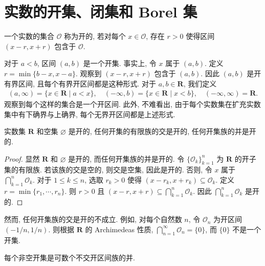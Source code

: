 \documentclass[../../main.tex]{subfiles}
\begin{document}
\section{实数的开集、闭集和 Borel 集}\label{section:ch01-开集闭集Borel}

\begin{definition}[开集]\label{definition:ch01-开集}
一个实数的集合 $\mathcal{O}$ 称为开的, 若对每个 $x\in\mathcal{O}$, 存在 $r>0$ 使得区间 $(x-r,x+r)$ 包含于 $\mathcal{O}$.
\end{definition}

对于 $a<b$, 区间 $(a,b)$ 是一个开集. 事实上, 令 $x$ 属于 $(a,b)$. 定义 $r=\min\{b-x,x-a\}$. 观察到 $(x-r,x+r)$ 包含于 $(a,b)$. 因此 $(a,b)$ 是开有界区间, 且每个有界开区间都是这种形式. 对于 $a,b\in\mathbf{R}$, 我们定义
\begin{align*}
(a,\infty)=\{x\in\mathbf{R}\mid a<x\},\quad (-\infty,b)=\{x\in\mathbf{R}\mid x<b\},\quad (-\infty,\infty)=\mathbf{R}.
\end{align*}
观察到每个这样的集合是一个开区间. 此外, 不难看出, 由于每个实数集在扩充实数集中有下确界与上确界, 每个无界开区间都是上述形式.

\begin{proposition}\label{proposition:ch01-开集性质}
实数集 $\mathbf{R}$ 和空集 $\varnothing$ 是开的, 任何开集的有限族的交是开的, 任何开集族的并是开的.
\end{proposition}

\begin{proof}
显然 $\mathbf{R}$ 和 $\varnothing$ 是开的, 而任何开集族的并是开的. 令 $\{\mathcal{O}_{k}\}_{k=1}^{n}$ 为 $\mathbf{R}$ 的开子集的有限族. 若该族的交是空的, 则交是空集, 因此是开的. 否则, 令 $x$ 属于 $\bigcap_{k=1}^{n}\mathcal{O}_{k}$. 对于 $1\leqslant k\leqslant n$, 选取 $r_{k}>0$ 使得 $(x-r_{k},x+r_{k})\subseteq\mathcal{O}_{k}$. 定义 $r=\min\{r_{1},\cdots,r_{n}\}$. 则 $r>0$ 且 $(x-r,x+r)\subseteq\bigcap_{k=1}^{n}\mathcal{O}_{k}$. 因此 $\bigcap_{k=1}^{n}\mathcal{O}_{k}$ 是开的.
\end{proof}

然而, 任何开集族的交是开的不成立. 例如, 对每个自然数 $n$, 令 $\mathcal{O}_{n}$ 为开区间 $(-1/n,1/n)$. 则根据 $\mathbf{R}$ 的 Archimedeas 性质, $\bigcap_{n=1}^{\infty}\mathcal{O}_{n}=\{0\}$, 而 $\{0\}$ 不是一个开集.

\begin{proposition}\label{proposition:ch01-开区间分解}
每个非空开集是可数个不交开区间族的并.
\end{proposition}
\end{document}
